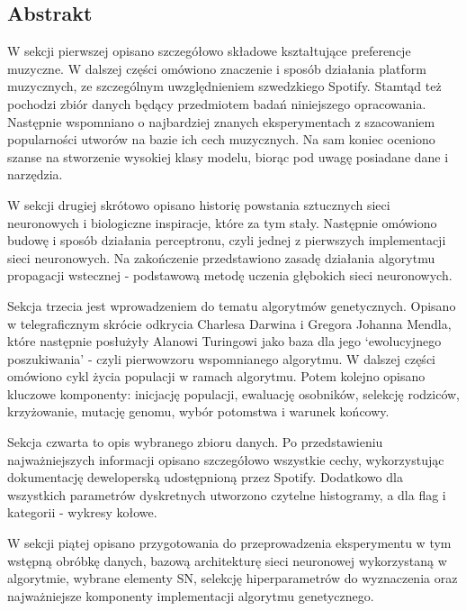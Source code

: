\documentclass[a4paper,11pt]{article}
\begin{document}
    \subsection{Abstrakt}

    W sekcji pierwszej opisano szczegółowo składowe kształtujące preferencje muzyczne. W dalszej części omówiono znaczenie i sposób działania platform muzycznych, ze szczególnym uwzględnieniem szwedzkiego Spotify. Stamtąd też pochodzi zbiór danych będący przedmiotem badań niniejszego opracowania. Następnie wspomniano o najbardziej znanych eksperymentach z szacowaniem popularności utworów na bazie ich cech muzycznych. Na sam koniec oceniono szanse na stworzenie wysokiej klasy modelu, biorąc pod uwagę posiadane dane i narzędzia.

    \bigskip

    W sekcji drugiej skrótowo opisano historię powstania sztucznych sieci neuronowych i biologiczne inspiracje, które za tym stały. Następnie omówiono budowę i sposób działania perceptronu, czyli jednej z pierwszych implementacji sieci neuronowych. Na zakończenie przedstawiono zasadę działania algorytmu propagacji wstecznej - podstawową metodę uczenia głębokich sieci neuronowych.

    \bigskip

    Sekcja trzecia jest wprowadzeniem do tematu algorytmów genetycznych. Opisano w telegraficznym skrócie odkrycia Charlesa Darwina i Gregora Johanna Mendla, które następnie posłużyły Alanowi Turingowi jako baza dla jego `ewolucyjnego poszukiwania' - czyli pierwowzoru wspomnianego algorytmu. W dalszej części omówiono cykl życia populacji w ramach algorytmu. Potem kolejno opisano kluczowe komponenty: inicjację populacji, ewaluację osobników, selekcję rodziców, krzyżowanie, mutację genomu, wybór potomstwa i warunek końcowy.

    \bigskip

    Sekcja czwarta to opis wybranego zbioru danych. Po przedstawieniu najważniejszych informacji opisano szczegółowo wszystkie cechy, wykorzystując dokumentację deweloperską udostępnioną przez Spotify. Dodatkowo dla wszystkich parametrów dyskretnych utworzono czytelne histogramy, a dla flag i kategorii - wykresy kołowe.

    \bigskip

    W sekcji piątej opisano przygotowania do przeprowadzenia eksperymentu w tym wstępną obróbkę danych, bazową architekturę sieci neuronowej wykorzystaną w algorytmie, wybrane elementy SN, selekcję hiperparametrów do wyznaczenia oraz najważniejsze komponenty implementacji algorytmu genetycznego.
\end{document}
